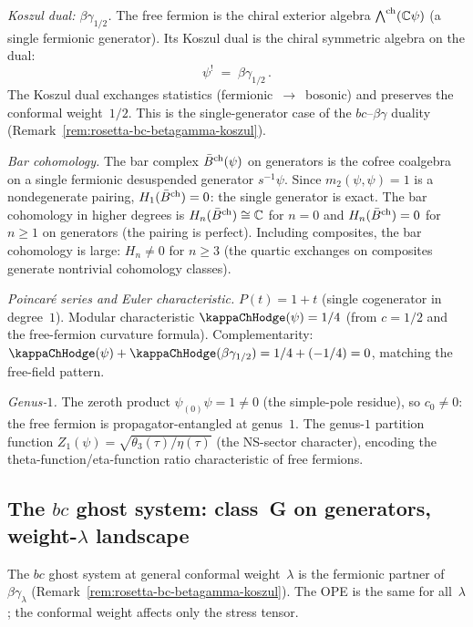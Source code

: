 \begin{computation}
\smallskip
\noindent
\emph{Koszul dual: $\beta\gamma_{1/2}$.}
The free fermion is the chiral exterior algebra
$\bigwedge^{\mathrm{ch}}(\mathbb{C}\psi)$ (a single fermionic
generator). Its Koszul dual is the chiral symmetric
algebra on the dual:
\begin{equation}\label{eq:free-fermion-koszul}
\psi^! \;=\; \beta\gamma_{1/2}\,.
\end{equation}
The Koszul dual exchanges statistics
(fermionic~$\to$~bosonic) and preserves the
conformal weight~$1/2$. This is the single-generator
case of the $bc$--$\beta\gamma$ duality
(Remark~\ref{rem:rosetta-bc-betagamma-koszul}).

\smallskip
\noindent
\emph{Bar cohomology.}
The bar complex $\bar{B}^{\mathrm{ch}}(\psi)$ on generators is the
cofree coalgebra on a single fermionic desuspended generator
$s^{-1}\psi$. Since $m_2(\psi,\psi) = 1$ is a nondegenerate
pairing, $H_1(\bar{B}^{\mathrm{ch}}) = 0$: the single generator is
exact. The bar cohomology in higher degrees is
$H_n(\bar{B}^{\mathrm{ch}}) \cong \mathbb{C}$ for $n = 0$ and
$H_n(\bar{B}^{\mathrm{ch}}) = 0$ for $n \ge 1$ on generators
(the pairing is perfect). Including composites, the
bar cohomology is large: $H_n \ne 0$ for $n \ge 3$
(the quartic exchanges on composites generate
nontrivial cohomology classes).

\smallskip
\noindent
\emph{Poincar\'{e} series and Euler characteristic.}
$P(t) = 1 + t$ (single cogenerator in degree~$1$).
Modular characteristic $\kappaChHodge(\psi) = 1/4$
(from $c = 1/2$ and the free-fermion curvature formula).
Complementarity: $\kappaChHodge(\psi) + \kappaChHodge(\beta\gamma_{1/2})
= 1/4 + (-1/4) = 0$, matching the free-field pattern.

\smallskip
\noindent
\emph{Genus-$1$.}
The zeroth product $\psi_{(0)}\psi = 1 \ne 0$
(the simple-pole residue), so $c_0 \ne 0$: the free fermion is
propagator-entangled at genus~$1$. The genus-$1$ partition function
$Z_1(\psi) = \sqrt{\theta_3(\tau)/\eta(\tau)}$
(the NS-sector character), encoding the
theta-function/eta-function ratio characteristic of
free fermions.
\end{computation}

\subsection{The $bc$ ghost system: class~G on generators, weight-$\lambda$ landscape}%
\label{subsec:bc-ordered-bar}%
%

The $bc$ ghost system at general conformal weight~$\lambda$
is the fermionic partner of $\beta\gamma_\lambda$
(Remark~\ref{rem:rosetta-bc-betagamma-koszul}). The OPE
is the same for all~$\lambda$; the conformal weight affects
only the stress tensor.

